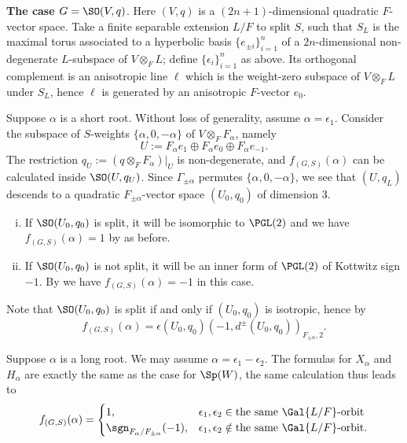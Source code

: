 \documentclass[a4paper,10pt]{article}
\begin{document}
\textbf{The case $G=\SO(V,q)$}. Here $(V,q)$ is a $(2n+1)$-dimensional quadratic $F$-vector space. Take a finite separable extension $L/F$ to split $S$, such that $S_L$ is the maximal torus associated to a hyperbolic basis $\{e_{\pm i}\}_{i=1}^n$ of a $2n$-dimensional non-degenerate $L$-subspace of $V \otimes_F L$; define $\{\epsilon_i\}_{i=1}^n$ as above. Its orthogonal complement is an anisotropic line $\ell$ which is the weight-zero subspace of $V \otimes_F L$ under $S_L$, hence $\ell$ is generated by an anisotropic $F$-vector $e_0$.
\begin{asparaenum}
	\item Suppose $\alpha$ is a short root. Without loss of generality, assume $\alpha = \epsilon_1$. Consider the subspace of $S$-weights $\{\alpha,0,-\alpha\}$ of $V \otimes_F F_\alpha$, namely
	\[ U := F_\alpha e_1 \oplus F_\alpha e_0 \oplus F_\alpha e_{-1}. \]
	The restriction $q_U := (q \otimes_F F_\alpha)|_U$ is non-degenerate, and $f_{(G,S)}(\alpha)$ can be calculated inside $\SO(U, q_U)$. Since $\Gamma_{\pm\alpha}$ permutes $\{\alpha, 0, -\alpha\}$, we see that $(U, q_L)$ descends to a quadratic $F_{\pm\alpha}$-vector space $(U_0, q_0)$ of dimension $3$.
	\begin{enumerate}[(i)]
		\item If $\SO(U_0, q_0)$ is split, it will be isomorphic to $\PGL(2)$ and we have $f_{(G,S)}(\alpha) = 1$ by \cite[Lemma 7.13]{Kal15} as before.
		\item If $\SO(U_0, q_0)$ is not split, it will be an inner form of $\PGL(2)$ of Kottwitz sign $-1$. By \cite[Proposition 4.3]{Kal15} we have $f_{(G,S)}(\alpha) = -1$ in this case.
	\end{enumerate}
	Note that $\SO(U_0, q_0)$ is split if and only if $(U_0, q_0)$ is isotropic, hence by \cite[12.7 + 14.3]{Sch85}
	\begin{equation}\label{eqn:SO-split}
		f_{(G,S)}(\alpha) = \epsilon(U_0, q_0) (-1, d^\pm(U_0, q_0))_{F_{\pm\alpha}, 2}.
	\end{equation}
	\item Suppose $\alpha$ is a long root. We may assume $\alpha = \epsilon_1 - \epsilon_2$. The formulas for $X_\alpha$ and $H_\alpha$ are exactly the same as the case for $\Sp(W)$, the same calculation thus leads to
	\[ f_{(G,S)}(\alpha) = \begin{cases}
		1, & \epsilon_1, \epsilon_2 \in \text{the same $\Gal{L/F}$-orbit} \\
		\sgn_{F_\alpha/F_{\pm\alpha}}(-1), & \epsilon_1, \epsilon_2 \notin \text{the same $\Gal{L/F}$-orbit}.
	\end{cases} \]
\end{asparaenum}
\end{document}
